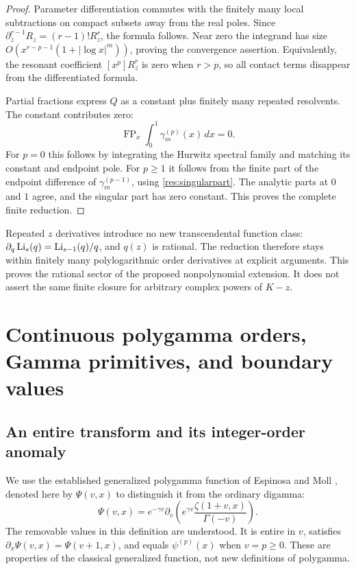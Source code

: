 \begin{proof}
Parameter differentiation commutes with the finitely many local
subtractions on compact subsets away from the real poles. Since
$\partial_z^{r-1}R_z=(r-1)!R_z^r$, the formula follows.
Near zero the integrand has size
$O(x^{r-p-1}(1+|\log x|^m))$, proving the convergence assertion.
Equivalently, the resonant coefficient $[x^p]R_z^r$ is zero
when $r>p$, so all contact terms disappear from the differentiated
formula.

Partial fractions express $Q$ as a constant plus finitely many
repeated resolvents. The constant contributes zero:
\[
 \operatorname{FP}_x\int_0^1\gamma_m^{(p)}(x)\,dx=0.
\]
For $p=0$ this follows by integrating the Hurwitz spectral family
and matching its constant and endpoint pole. For $p\ge1$ it
follows from the finite part of the endpoint difference of
$\gamma_m^{(p-1)}$, using \eqref{res:singularpart}. The analytic
parts at $0$ and $1$ agree, and the singular part has zero constant.
This proves the complete finite reduction.
\end{proof}

Repeated $z$ derivatives introduce no new transcendental function
class: $\partial_q\operatorname{Li}_s(q)=\operatorname{Li}_{s-1}(q)/q$, and $q(z)$ is rational.
The reduction therefore stays within finitely many polylogarithmic
order derivatives at explicit arguments. This proves the rational
sector of the proposed nonpolynomial extension. It does not assert
the same finite closure for arbitrary complex powers of $K-z$.

\section{Continuous polygamma orders, Gamma primitives, and boundary values}
\label{res:primitive-section}

\subsection{An entire transform and its integer-order anomaly}

We use the established generalized polygamma function of Espinosa
and Moll \cite{EM}, denoted here by $\Psi(v,x)$ to distinguish it
from the ordinary digamma:
\begin{equation}\label{res:EM}
 \Psi(v,x)=e^{-\gamma v}\partial_v
       \left(e^{\gamma v}\frac{\zeta(1+v,x)}{\Gamma(-v)}\right).
\end{equation}
The removable values in this definition are understood. It is entire
in $v$, satisfies $\partial_x\Psi(v,x)=\Psi(v+1,x)$, and equals
$\psi^{(p)}(x)$ when $v=p\ge0$. These are properties of the
classical generalized function, not new definitions of polygamma.

